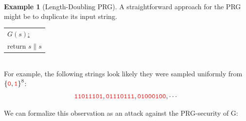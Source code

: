 \documentclass[12pt,openany]{book}
\theoremstyle{definition}
\newtheorem{example}{Example}[chapter]
\newcommand{\zero}{\textcolor{red}{\texttt{0}}}
\newcommand{\one}{\textcolor{red}{\texttt{1}}}
\newcommand{\tab}{\hspace{12pt}}
\newcommand{\binaryfield}{\set{\zero,\one}}
\begin{document}
\newpage
\begin{example}[Length-Doubling PRG] %
	A straightforward approach for the PRG might be to duplicate its input string.
	\begin{table}[h!]\centering
		\begin{tabular}{|l|}
			\hline
			\underline{$G(s)$:}\\
			\tab return $s\parallel s$\\
			\hline
		\end{tabular}
	\end{table}\\
	For example, the following strings look likely they were sampled uniformly from $\binaryfield^8$:
	\[
	\one\one\zero\one\one\one\zero\one, \zero\one\one\one\zero\one\one\one,
	\zero\one\zero\zero\zero\one\zero\zero, \cdots
	\]
	
	We can formalize this observation as an attack against the PRG-security of G:	
	

\end{example}
\end{document}
